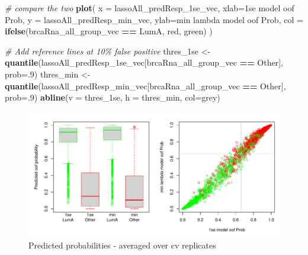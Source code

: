 \documentclass[
]{book}
\newenvironment{Shaded}{\begin{snugshade}}{\end{snugshade}}
\newcommand{\CommentTok}[1]{\textcolor[rgb]{0.56,0.35,0.01}{\textit{#1}}}
\newcommand{\DataTypeTok}[1]{\textcolor[rgb]{0.13,0.29,0.53}{#1}}
\newcommand{\DecValTok}[1]{\textcolor[rgb]{0.00,0.00,0.81}{#1}}
\newcommand{\KeywordTok}[1]{\textcolor[rgb]{0.13,0.29,0.53}{\textbf{#1}}}
\newcommand{\NormalTok}[1]{#1}
\newcommand{\OperatorTok}[1]{\textcolor[rgb]{0.81,0.36,0.00}{\textbf{#1}}}
\newcommand{\StringTok}[1]{\textcolor[rgb]{0.31,0.60,0.02}{#1}}
\begin{document}
\begin{Shaded}
\begin{Highlighting}[]
\CommentTok{\# compare the two}
\KeywordTok{plot}\NormalTok{(}
 \DataTypeTok{x =}\NormalTok{ lassoAll\_predResp\_1se\_vec, }\DataTypeTok{xlab=}\StringTok{\textquotesingle{}1se model oof Prob\textquotesingle{}}\NormalTok{,}
 \DataTypeTok{y =}\NormalTok{ lassoAll\_predResp\_min\_vec, }\DataTypeTok{ylab=}\StringTok{\textquotesingle{}min lambda model oof Prob\textquotesingle{}}\NormalTok{,}
 \DataTypeTok{col =} \KeywordTok{ifelse}\NormalTok{(brcaRna\_all\_group\_vec }\OperatorTok{==}\StringTok{ \textquotesingle{}LumA\textquotesingle{}}\NormalTok{, }\StringTok{\textquotesingle{}red\textquotesingle{}}\NormalTok{, }\StringTok{\textquotesingle{}green\textquotesingle{}}\NormalTok{)}
\NormalTok{)}
 
\CommentTok{\# Add reference lines at 10\% false positive}
\NormalTok{thres\_1se <{-}}\StringTok{ }\KeywordTok{quantile}\NormalTok{(lassoAll\_predResp\_1se\_vec[brcaRna\_all\_group\_vec }\OperatorTok{==}\StringTok{ \textquotesingle{}Other\textquotesingle{}}\NormalTok{], }\DataTypeTok{prob=}\NormalTok{.}\DecValTok{9}\NormalTok{)}
\NormalTok{thres\_min <{-}}\StringTok{ }\KeywordTok{quantile}\NormalTok{(lassoAll\_predResp\_min\_vec[brcaRna\_all\_group\_vec }\OperatorTok{==}\StringTok{ \textquotesingle{}Other\textquotesingle{}}\NormalTok{], }\DataTypeTok{prob=}\NormalTok{.}\DecValTok{9}\NormalTok{)}
\KeywordTok{abline}\NormalTok{(}\DataTypeTok{v =}\NormalTok{ thres\_1se, }\DataTypeTok{h =}\NormalTok{ thres\_min, }\DataTypeTok{col=}\StringTok{\textquotesingle{}grey\textquotesingle{}}\NormalTok{)}
\end{Highlighting}
\end{Shaded}

\begin{figure}
\centering
\includegraphics{Static/figures/brca-rnaseq-get-sample-pred-1.pdf}
\caption{\label{fig:brca-rnaseq-get-sample-pred}Predicted probabilities - averaged over cv replicates}
\end{figure}
\end{document}
